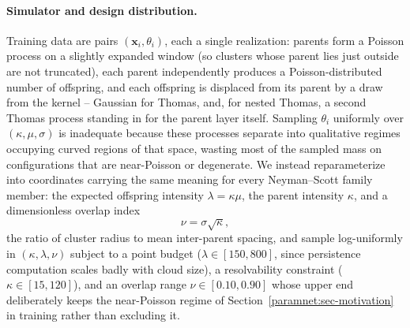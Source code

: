 \documentclass[11pt,a4paper]{article}
\theoremstyle{definitioncolon}
\begin{document}
\paragraph{Simulator and design distribution.}
Training data are pairs $(\mathbf{x}_i,\theta_i)$, each a single
realization: parents form a Poisson process on a slightly expanded window
(so clusters whose parent lies just outside are not truncated), each parent
independently produces a Poisson-distributed number of offspring, and each
offspring is displaced from its parent by a draw from the kernel --
Gaussian for Thomas, and, for nested Thomas, a second Thomas process
standing in for the parent layer itself. Sampling $\theta_i$ uniformly over
$(\kappa,\mu,\sigma)$ is inadequate because these processes separate into
qualitative regimes occupying curved regions of that space, wasting most of
the sampled mass on configurations that are near-Poisson or degenerate. We
instead reparameterize into coordinates carrying the same meaning for every
Neyman--Scott family member: the expected offspring intensity
$\lambda=\kappa\mu$, the parent intensity $\kappa$, and a dimensionless
overlap index
\begin{equation}
\label{paramnet:eq-reparam}
\nu = \sigma\sqrt{\kappa},
\end{equation}
the ratio of cluster radius to mean inter-parent spacing, and sample
log-uniformly in $(\kappa,\lambda,\nu)$ subject to a point budget
($\lambda\in[150,800]$, since persistence computation scales badly with
cloud size), a resolvability constraint ($\kappa\in[15,120]$), and an
overlap range $\nu\in[0.10,0.90]$ whose upper end deliberately keeps the
near-Poisson regime of Section~\ref{paramnet:sec-motivation} in training
rather than excluding it.
\end{document}
